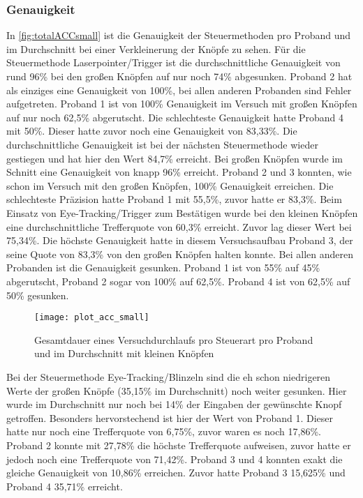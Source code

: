 \subsubsection{Genauigkeit}
In \autoref{fig:totalACCsmall} ist die Genauigkeit der Steuermethoden pro Proband und im Durchschnitt bei einer Verkleinerung der Knöpfe zu sehen. Für die Steuermethode Laserpointer/Trigger ist die durchschnittliche Genauigkeit von rund 96\% bei den großen Knöpfen auf nur noch 74\% abgesunken. Proband 2 hat als einziges eine Genauigkeit von 100\%, bei allen anderen Probanden sind Fehler aufgetreten. Proband 1 ist von 100\% Genauigkeit im Versuch mit großen Knöpfen auf nur noch 62,5\% abgerutscht. Die schlechteste Genauigkeit hatte Proband 4 mit 50\%. Dieser hatte zuvor noch eine Genauigkeit von 83,33\%. Die durchschnittliche Genauigkeit ist bei der nächsten Steuermethode wieder gestiegen und hat hier den Wert 84,7\% erreicht. Bei großen Knöpfen wurde im Schnitt eine Genauigkeit von knapp 96\% erreicht. Proband 2 und 3 konnten, wie schon im Versuch mit den großen Knöpfen, 100\% Genauigkeit erreichen. Die schlechteste Präzision hatte Proband 1 mit 55,5\%, zuvor hatte er 83,3\%. Beim Einsatz von Eye-Tracking/Trigger zum Bestätigen wurde bei den kleinen Knöpfen eine durchschnittliche Trefferquote von 60,3\% erreicht. Zuvor lag dieser Wert bei 75,34\%. Die höchste Genauigkeit hatte in diesem Versuchsaufbau Proband 3, der seine Quote von 83,3\% von den großen Knöpfen halten konnte. Bei allen anderen Probanden ist die Genauigkeit gesunken. Proband 1 ist von 55\% auf 45\% abgerutscht, Proband 2 sogar von 100\% auf 62,5\%. Proband 4 ist von 62,5\% auf 50\% gesunken.

\begin{figure}[!htbp]
	\centering
	\texttt{[image: plot\_acc\_small]}
	\caption[Gesamtdauer eines Versuchdurchlaufs pro Steuerart pro Proband und im Durchschnitt mit kleinen Knöpfen]{Gesamtdauer eines Versuchdurchlaufs pro Steuerart pro Proband und im Durchschnitt mit kleinen Knöpfen}
	\label{fig:totalACCsmall}
\end{figure}

Bei der Steuermethode Eye-Tracking/Blinzeln sind die eh schon niedrigeren Werte der großen Knöpfe (35,15\% im Durchschnitt) noch weiter gesunken. Hier wurde im Durchschnitt nur noch bei 14\% der Eingaben der gewünschte Knopf getroffen. Besonders hervorstechend ist hier der Wert von Proband 1. Dieser hatte nur noch eine Trefferquote von 6,75\%, zuvor waren es noch 17,86\%. Proband 2 konnte mit 27,78\% die höchste Trefferquote aufweisen, zuvor hatte er jedoch noch eine Trefferquote von 71,42\%. Proband 3 und 4 konnten exakt die gleiche Genauigkeit von 10,86\% erreichen. Zuvor hatte Proband 3 15,625\% und Proband 4 35,71\% erreicht. 

